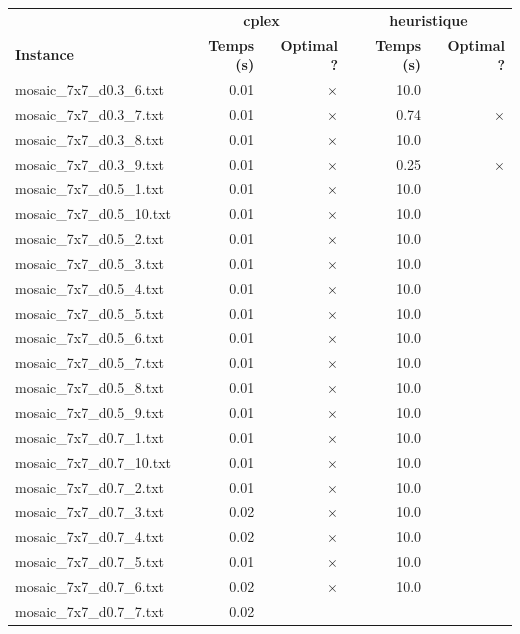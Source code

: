 \documentclass{article}
\begin{document}
\newpage
\begin{center}
\renewcommand{\arraystretch}{1.4} 
 \begin{tabular}{lrrrr}
	\hline
 & \multicolumn{2}{c}{\textbf{cplex}} & \multicolumn{2}{c}{\textbf{heuristique}}\\
\textbf{Instance}  & \textbf{Temps (s)} & \textbf{Optimal ?}  & \textbf{Temps (s)} & \textbf{Optimal ?} \\\hline

mosaic\_7x7\_d0.3\_6.txt & 0.01 & 
$\times$
 & 10.0 & 
\\
mosaic\_7x7\_d0.3\_7.txt & 0.01 & 
$\times$
 & 0.74 & 
$\times$
\\
mosaic\_7x7\_d0.3\_8.txt & 0.01 & 
$\times$
 & 10.0 & 
\\
mosaic\_7x7\_d0.3\_9.txt & 0.01 & 
$\times$
 & 0.25 & 
$\times$
\\
mosaic\_7x7\_d0.5\_1.txt & 0.01 & 
$\times$
 & 10.0 & 
\\
mosaic\_7x7\_d0.5\_10.txt & 0.01 & 
$\times$
 & 10.0 & 
\\
mosaic\_7x7\_d0.5\_2.txt & 0.01 & 
$\times$
 & 10.0 & 
\\
mosaic\_7x7\_d0.5\_3.txt & 0.01 & 
$\times$
 & 10.0 & 
\\
mosaic\_7x7\_d0.5\_4.txt & 0.01 & 
$\times$
 & 10.0 & 
\\
mosaic\_7x7\_d0.5\_5.txt & 0.01 & 
$\times$
 & 10.0 & 
\\
mosaic\_7x7\_d0.5\_6.txt & 0.01 & 
$\times$
 & 10.0 & 
\\
mosaic\_7x7\_d0.5\_7.txt & 0.01 & 
$\times$
 & 10.0 & 
\\
mosaic\_7x7\_d0.5\_8.txt & 0.01 & 
$\times$
 & 10.0 & 
\\
mosaic\_7x7\_d0.5\_9.txt & 0.01 & 
$\times$
 & 10.0 & 
\\
mosaic\_7x7\_d0.7\_1.txt & 0.01 & 
$\times$
 & 10.0 & 
\\
mosaic\_7x7\_d0.7\_10.txt & 0.01 & 
$\times$
 & 10.0 & 
\\
mosaic\_7x7\_d0.7\_2.txt & 0.01 & 
$\times$
 & 10.0 & 
\\
mosaic\_7x7\_d0.7\_3.txt & 0.02 & 
$\times$
 & 10.0 & 
\\
mosaic\_7x7\_d0.7\_4.txt & 0.02 & 
$\times$
 & 10.0 & 
\\
mosaic\_7x7\_d0.7\_5.txt & 0.01 & 
$\times$
 & 10.0 & 
\\
mosaic\_7x7\_d0.7\_6.txt & 0.02 & 
$\times$
 & 10.0 & 
\\
mosaic\_7x7\_d0.7\_7.txt & 0.02 & 

\end{tabular}
\end{center}
\end{document}
